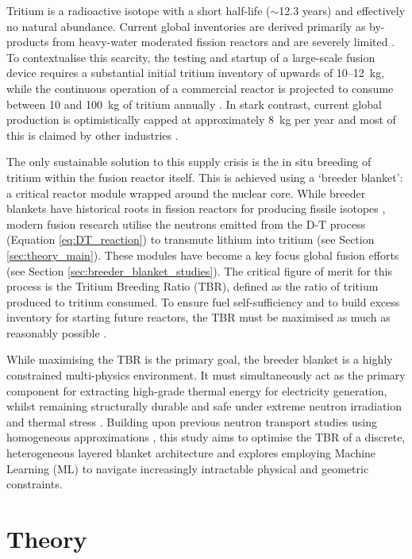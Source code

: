 \documentclass[11pt]{article}
\begin{document}
Tritium is a radioactive isotope with a short half-life ($\sim$12.3 years) and effectively no
natural abundance. Current global inventories are derived primarily as by-products from heavy-water
moderated fission reactors and are severely limited \citep{kovari_tritium_2018}. To contextualise
this scarcity, the testing and startup of a large-scale fusion device requires a substantial initial
tritium inventory of upwards of 10--12~kg, while the continuous operation of a commercial reactor is
projected to consume between 10 and 100~kg of tritium annually \citep{lord_fusing_2024}. In stark
contrast, current global production is optimistically capped at approximately 8~kg per year and most
of this is claimed by other industries \citep{pearson_tritium_2018}.

The only sustainable solution to this supply crisis is the in situ breeding of tritium within the
fusion reactor itself. This is achieved using a `breeder blanket': a critical reactor module wrapped
around the nuclear core. While breeder blankets have historical roots in fission reactors for
producing fissile isotopes \citep{moir_fusion_1982, maniscalco_fusion_1984}, modern fusion research
utilise the neutrons emitted from the D-T process (Equation \ref{eq:DT_reaction}) to transmute
lithium into tritium (see Section \ref{sec:theory_main}). These modules have become a key focus
global fusion efforts (see Section \ref{sec:breeder_blanket_studies}). The critical figure of merit
for this process is the Tritium Breeding Ratio (TBR), defined as the ratio of tritium produced to
tritium consumed. To ensure fuel self-sufficiency and to build excess inventory for starting future
reactors, the TBR must be maximised as much as reasonably possible \citep{sawan_physics_2006}.

While maximising the TBR is the primary goal, the breeder blanket is a highly constrained
multi-physics environment. It must simultaneously act as the primary component for extracting
high-grade thermal energy for electricity generation, whilst remaining structurally durable and safe
under extreme neutron irradiation and thermal stress \citep{federici_overview_2019}. Building upon
previous neutron transport studies using homogeneous approximations \citep{khan_mphys_sem1}, this
study aims to optimise the TBR of a discrete, heterogeneous layered blanket architecture and
explores employing Machine Learning (ML) to navigate increasingly intractable physical and geometric
constraints.


\section{Theory}
\end{document}
